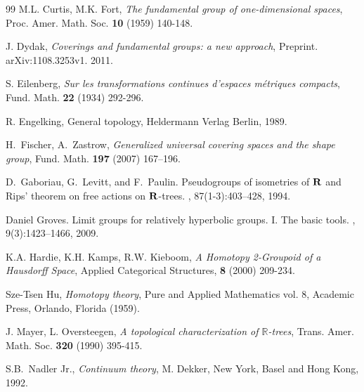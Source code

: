 \documentclass[12pt, leqno]{amsart}
\theoremstyle{definition}\newtheorem{definition}[theorem]{Definition}
\begin{document}
\begin{thebibliography}{99}
 M.L. Curtis, M.K. Fort, \textit{The fundamental group of one-dimensional spaces}, Proc. Amer. Math. Soc. {\bf 10} (1959) 140-148.


 J. Dydak, \textit{Coverings and fundamental groups: a new approach},  Preprint. arXiv:1108.3253v1. 2011.


 S. Eilenberg, \textit{Sur les transformations continues d'espaces m\'etriques compacts}, Fund. Math. {\bf 22}  (1934) 292-296.

 R. Engelking, General topology, Heldermann Verlag Berlin, 1989.


 H.~Fischer, A.~Zastrow, \emph{Generalized universal covering spaces and the shape group}, Fund. Math. {\bf 197} (2007) 167--196.

D.~Gaboriau, G.~Levitt, and F.~Paulin.
\newblock Pseudogroups of isometries of {${\bf R}$} and {R}ips' theorem on free
  actions on {${\bf R}$}-trees.
, 87(1-3):403--428, 1994.

Daniel Groves.
\newblock Limit groups for relatively hyperbolic groups. {I}. {T}he basic
  tools.
, 9(3):1423--1466, 2009.

 K.A. Hardie, K.H. Kamps, R.W. Kieboom, \textit{A Homotopy 2-Groupoid of a Hausdorff Space}, Applied Categorical Structures, {\bf 8} (2000) 209-234.

 Sze-Tsen Hu, \textit{Homotopy theory}, Pure and Applied Mathematics vol. 8, Academic Press, Orlando, Florida (1959).

 J. Mayer, L. Oversteegen, \textit{A topological characterization of $\mathbb{R}$-trees}, Trans. Amer. Math. Soc. {\bf 320} (1990) 395-415.


 S.B.~Nadler Jr., \textit{Continuum theory}, M. Dekker, New York, Basel and Hong Kong, 1992.


\end{thebibliography}
\end{document}
